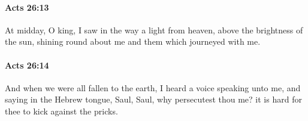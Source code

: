 		\paragraph{Acts 26:13} %
			\label{ACTS-26-13}

			At midday, O king, I saw in the way a light from heaven, above the brightness of the sun, shining round about me and them which journeyed with me.

			\begin{framed}
			\scriptsize
				\begin{compactdesc}
					\item[SBLG] 
				\end{compactdesc}
			\end{framed}

		\paragraph{Acts 26:14} %
			\label{ACTS-26-14}

			And when we were all fallen to the earth, I heard a voice speaking unto me, and saying in the Hebrew tongue, Saul, Saul, why persecutest thou me?  it is hard for thee to kick against the pricks.

